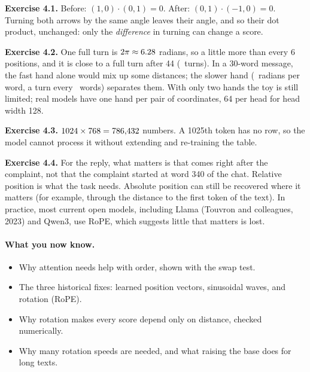 \noindent\textbf{Exercise 4.1.} Before: $(1,0)\cdot(0,1)=0$. After: $(0,1)\cdot(-1,0)=0$. Turning both
arrows by the same angle leaves their angle, and so their dot product, unchanged: only the
\emph{difference} in turning can change a score.

\noindent\textbf{Exercise 4.2.} One full turn is $2\pi\approx6.28$ radians, so a little more than every 6 positions, and
it is close to a full turn after 44 (\nFourWrapTurns\ turns). In a 30-word message, the fast hand alone
would mix up some distances; the slower hand (\nFourThetaTwo\ radians per word, a turn every \nFourToySlowWl\ words) separates
them. With only two hands the toy is still limited; real models have one hand per pair of coordinates, 64 per head for head width 128.

\noindent\textbf{Exercise 4.3.} $1024\times768 = 786{,}432$ numbers. A 1025th token has no row, so the model
cannot process it without extending and re-training the table.

\noindent\textbf{Exercise 4.4.} For the reply, what matters is that  comes right after the
complaint, not that the complaint started at word 340 of the chat. Relative position is what the task
needs. Absolute position can still be recovered where it matters (for example, through the distance to
the first token of the text). In practice, most current open models, including Llama (Touvron and
colleagues, 2023) and Qwen3, use RoPE, which suggests little that matters is lost.

\paragraph{What you now know.}
\begin{itemize}
\item Why attention needs help with order, shown with the swap test.
\item The three historical fixes: learned position vectors, sinusoidal waves, and rotation (RoPE).
\item Why rotation makes every score depend only on distance, checked numerically.
\item Why many rotation speeds are needed, and what raising the base does for long texts.
\end{itemize}
